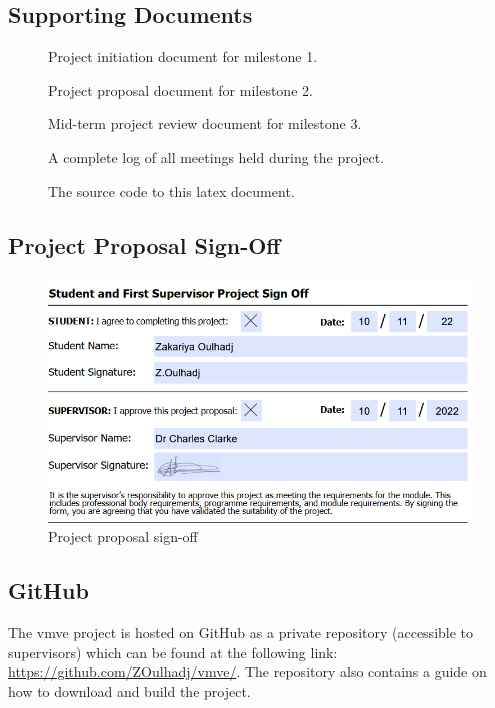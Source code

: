 \documentclass[11pt]{article}
\begin{document}
\subsection{Supporting Documents} \label{supporting_documents}
\begin{description}
  \item[] 
    Project initiation document for milestone 1.
  \item[]
    Project proposal document for milestone 2.
  \item[]
    Mid-term project review document for milestone 3.
  \item[]
    A complete log of all meetings held during the project.
  \item[]
    The source code to this latex document.
\end{description}

\subsection{Project Proposal Sign-Off} \label{project_proposal}
\begin{figure}[H]
  \centering
  \includegraphics[width=\textwidth]{images/project_signoff.png}
  \caption{Project proposal sign-off}
  \label{fig:project_signoff}
\end{figure}

\subsection{GitHub} \label{github}
The \gls*{vmve} project is hosted on GitHub as a private repository (accessible
to supervisors) which can be found at the following link:
\url{https://github.com/ZOulhadj/vmve/}. The repository also contains a guide on
how to download and build the project.
\end{document}
